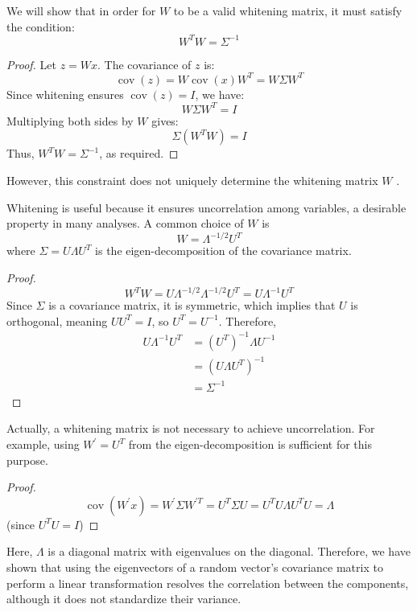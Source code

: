 \documentclass[12pt]{article}
\begin{document}
We will show that in order for \( W \) to be a valid whitening matrix, it must satisfy the condition:
\[
  W^T W=\Sigma^{-1}
\]

\begin{proof}
  Let \( z = W x \). The covariance of \( z \) is:
  \[
    \operatorname{cov}(z) = W \operatorname{cov}(x) W^T = W \Sigma W^T
  \]
  Since whitening ensures \( \operatorname{cov}(z) = I \), we have:
  \[
    W \Sigma W^T = I
  \]
  Multiplying both sides by \( W \) gives:
  \[
    \Sigma (W^T W) = I
  \]
  Thus, \( W^T W = \Sigma^{-1} \), as required.
\end{proof}

However, this constraint does not uniquely determine the whitening matrix \( W \) \cite{kessy2018optimal}.

Whitening is useful because it ensures uncorrelation among variables, a desirable property in many analyses. A common choice of \( W \) is
\[
  W=\Lambda^{-1 / 2} U^T
\]
where \( \Sigma=U \Lambda U^T \) is the eigen-decomposition of the covariance matrix. 

\begin{proof}
  \[
    W^T W=U \Lambda^{-1 / 2} \Lambda^{-1 / 2} U^T=U \Lambda^{-1} U^T
  \]
  Since \( \Sigma \) is a covariance matrix, it is symmetric, which implies that \( U \) is orthogonal, meaning \( U U^T = I \), so \( U^T = U^{-1} \). Therefore,
  \[
    \begin{aligned}
      U \Lambda^{-1} U^T & = \left(U^T\right)^{-1} \Lambda U^{-1} \\
                                                        & = \left(U \Lambda U^T\right)^{-1} \\
                                                        & = \Sigma^{-1}
  \end{aligned}
  \]
\end{proof}

Actually, a whitening matrix is not necessary to achieve uncorrelation. For example, using \( W^{\prime} = U^T \) from the eigen-decomposition is sufficient for this purpose.

\begin{proof}
  \[
    \operatorname{cov}\left(W^{\prime} x\right)=W^{\prime} \Sigma W^{\prime T}=U^T \Sigma U=U^T U \Lambda U^T U=\Lambda
  \]
  (since \( U^T U=I \))
\end{proof}

Here, \( \Lambda \) is a diagonal matrix with eigenvalues on the diagonal. Therefore, we have shown that using the eigenvectors of a random vector's covariance matrix to perform a linear transformation resolves the correlation between the components, although it does not standardize their variance.
\end{document}
